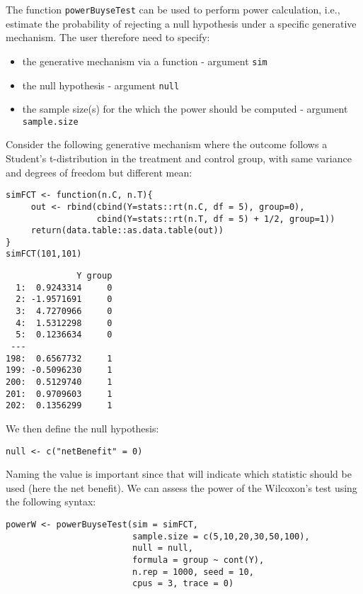 \documentclass[12pt]{article}
\begin{document}
The function \texttt{powerBuyseTest} can be used to perform power
calculation, i.e., estimate the probability of rejecting a null
hypothesis under a specific generative mechanism. The user therefore
need to specify:
\begin{itemize}
\item the generative mechanism via a function \hfill - argument \texttt{sim}
\item the null hypothesis \hfill - argument \texttt{null}
\item the sample size(s) for the which the power should be computed  \hfill - argument \texttt{sample.size}
\end{itemize}

\bigskip

Consider the following generative mechanism where the outcome follows
a Student's t-distribution in the treatment and control group, with same
variance and degrees of freedom but different mean:
\lstset{language=r,label= ,caption= ,captionpos=b,numbers=none}
\begin{lstlisting}
simFCT <- function(n.C, n.T){
	 out <- rbind(cbind(Y=stats::rt(n.C, df = 5), group=0),
				  cbind(Y=stats::rt(n.T, df = 5) + 1/2, group=1))
	 return(data.table::as.data.table(out))
}
simFCT(101,101)
\end{lstlisting}

\begin{verbatim}
              Y group
  1:  0.9243314     0
  2: -1.9571691     0
  3:  4.7270966     0
  4:  1.5312298     0
  5:  0.1236634     0
 ---                 
198:  0.6567732     1
199: -0.5096230     1
200:  0.5129740     1
201:  0.9709603     1
202:  0.1356299     1
\end{verbatim}

We then define the null hypothesis:
\lstset{language=r,label= ,caption= ,captionpos=b,numbers=none}
\begin{lstlisting}
null <- c("netBenefit" = 0)
\end{lstlisting}

Naming the value is important since that will indicate which statistic
should be used (here the net benefit). We can assess the power of the
Wilcoxon's test using the following syntax:
\lstset{language=r,label= ,caption= ,captionpos=b,numbers=none}
\begin{lstlisting}
powerW <- powerBuyseTest(sim = simFCT, 
						 sample.size = c(5,10,20,30,50,100),
						 null = null,
						 formula = group ~ cont(Y), 
						 n.rep = 1000, seed = 10,
						 cpus = 3, trace = 0)
\end{lstlisting}
\end{document}
